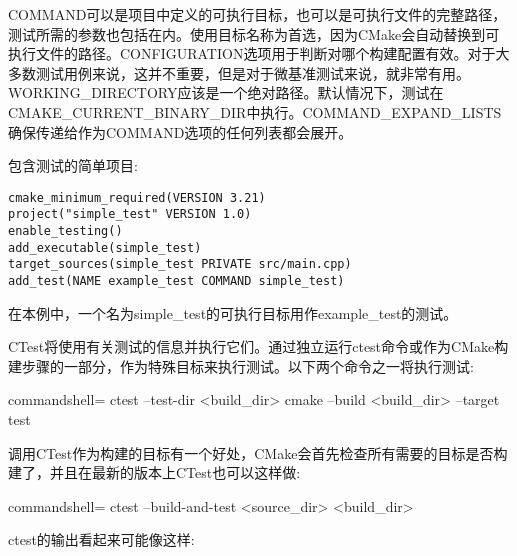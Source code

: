 COMMAND可以是项目中定义的可执行目标，也可以是可执行文件的完整路径，测试所需的参数也包括在内。使用目标名称为首选，因为CMake会自动替换到可执行文件的路径。CONFIGURATION选项用于判断对哪个构建配置有效。对于大多数测试用例来说，这并不重要，但是对于微基准测试来说，就非常有用。WORKING\_DIRECTORY应该是一个绝对路径。默认情况下，测试在CMAKE\_CURRENT\_BINARY\_DIR中执行。COMMAND\_EXPAND\_LISTS确保传递给作为COMMAND选项的任何列表都会展开。

包含测试的简单项目:

\begin{lstlisting}[style=styleCMake]
cmake_minimum_required(VERSION 3.21)
project("simple_test" VERSION 1.0)
enable_testing()
add_executable(simple_test)
target_sources(simple_test PRIVATE src/main.cpp)
add_test(NAME example_test COMMAND simple_test)
\end{lstlisting}

在本例中，一个名为simple\_test的可执行目标用作example\_test的测试。

CTest将使用有关测试的信息并执行它们。通过独立运行ctest命令或作为CMake构建步骤的一部分，作为特殊目标来执行测试。以下两个命令之一将执行测试:

\begin{tcblisting}{commandshell={}}
ctest --test-dir <build_dir>
cmake --build <build_dir> --target test
\end{tcblisting}

调用CTest作为构建的目标有一个好处，CMake会首先检查所有需要的目标是否构建了，并且在最新的版本上CTest也可以这样做:

\begin{tcblisting}{commandshell={}}
ctest --build-and-test <source_dir> <build_dir>
\end{tcblisting}

ctest的输出看起来可能像这样:


